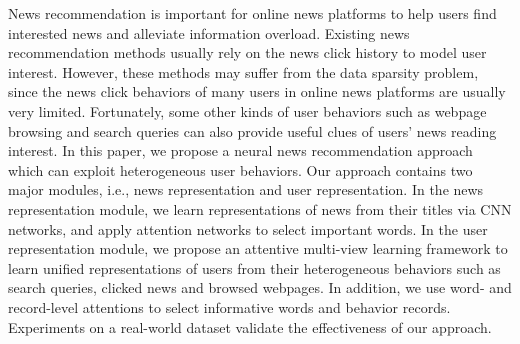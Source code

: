 News recommendation is important for online news platforms to help users find interested news and alleviate information overload. Existing news recommendation methods usually rely on the news click history to model user interest. However, these methods may suffer from the data sparsity problem, since the news click behaviors of many users in online news platforms are usually very limited. Fortunately, some other kinds of user behaviors such as webpage browsing and search queries can also provide useful clues of users' news reading interest. In this paper, we propose a neural news recommendation approach which can exploit heterogeneous user behaviors. Our approach contains two major modules, i.e., news representation and user representation. In the news representation module, we learn representations of news from their titles via CNN networks, and apply attention networks to select important words. In the user representation module, we propose an attentive multi-view learning framework to learn unified representations of users from their heterogeneous behaviors such as search queries, clicked news and browsed webpages. In addition, we use word- and record-level attentions to select informative words and behavior records. Experiments on a real-world dataset validate the effectiveness of our approach.